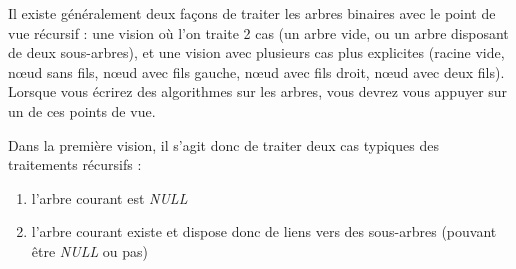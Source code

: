 \documentclass[11pt,a4paper]{article}
\begin{document}
\vspace*{-1.5cm}

Il existe généralement deux façons de traiter les arbres binaires avec le point de vue récursif : une vision où l'on traite 2 cas (un arbre vide, ou un arbre disposant de deux sous-arbres), et une vision avec plusieurs cas plus explicites (racine vide, nœud sans fils, nœud avec fils gauche, nœud avec fils droit, nœud avec deux fils).
Lorsque vous écrirez des algorithmes sur les arbres, vous devrez vous appuyer sur un de ces points de vue.

\medskip

Dans la première vision, il s'agit donc de traiter deux cas typiques des traitements récursifs :

\begin{enumerate}
\item l'arbre courant est \textit{NULL}
\item l'arbre courant existe et dispose donc de liens vers des sous-arbres (pouvant être \textit{NULL} ou pas)
\end{enumerate}

\end{document}
